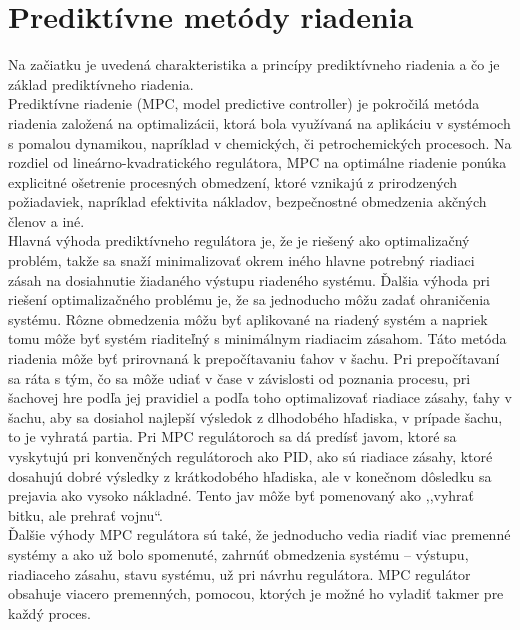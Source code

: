 \section{Prediktívne metódy riadenia}
Na začiatku je uvedená charakteristika a princípy prediktívneho riadenia a čo je základ prediktívneho riadenia.\\
\indent Prediktívne riadenie (MPC, model predictive controller) je pokročilá metóda riadenia založená na optimalizácii, ktorá bola využívaná na aplikáciu v systémoch s pomalou dynamikou, napríklad v chemických, či petrochemických procesoch. Na rozdiel od lineárno-kvadratického regulátora, MPC na optimálne riadenie ponúka explicitné ošetrenie procesných obmedzení, ktoré vznikajú z prirodzených požiadaviek, napríklad efektivita nákladov, bezpečnostné obmedzenia akčných členov a iné.\cite{MPC01} \\
\indent Hlavná výhoda prediktívneho regulátora je, že je riešený ako optimalizačný problém, takže sa snaží minimalizovať okrem iného hlavne potrebný riadiaci zásah na dosiahnutie žiadaného výstupu riadeného systému. Ďalšia výhoda pri riešení optimalizačného problému je, že sa jednoducho môžu zadať ohraničenia systému. Rôzne obmedzenia môžu byť aplikované na riadený systém a napriek tomu môže byť systém riaditeľný s minimálnym riadiacim zásahom. Táto metóda riadenia môže byť prirovnaná k prepočítavaniu ťahov v šachu. Pri prepočítavaní sa ráta s tým, čo sa môže udiať v čase v závislosti od poznania procesu, pri šachovej hre podľa jej pravidiel a podľa toho optimalizovať riadiace zásahy, ťahy v šachu, aby sa dosiahol najlepší výsledok z dlhodobého hľadiska, v prípade šachu, to je vyhratá partia. Pri MPC regulátoroch sa dá predísť javom, ktoré sa vyskytujú pri konvenčných regulátoroch ako PID, ako sú riadiace zásahy, ktoré dosahujú dobré výsledky z krátkodobého hľadiska, ale v konečnom dôsledku sa prejavia ako vysoko nákladné. Tento jav môže byť pomenovaný ako ,,vyhrať bitku, ale prehrať vojnu``. \\ 
\indent Ďalšie výhody MPC regulátora sú také, že jednoducho vedia riadiť viac premenné systémy a ako už bolo spomenuté, zahrnúť obmedzenia systému – výstupu, riadiaceho zásahu, stavu systému, už pri návrhu regulátora. MPC regulátor obsahuje viacero premenných, pomocou, ktorých je možné ho vyladiť takmer pre každý proces. \\
